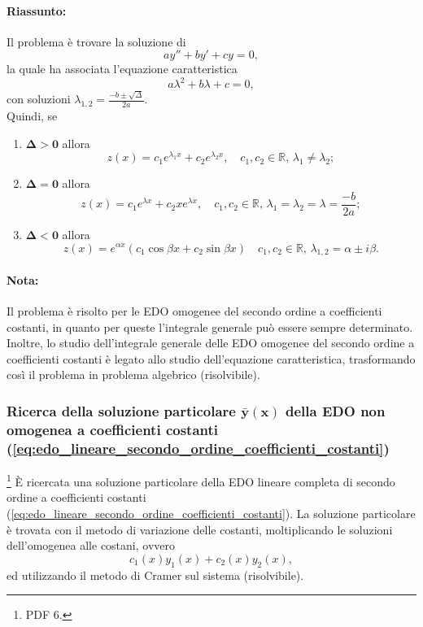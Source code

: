 \paragraph{Riassunto:} Il problema è trovare la soluzione di
\begin{equation*}
	ay'' + b y' + cy = 0,
\end{equation*}
la quale ha associata l'equazione caratteristica
\begin{equation*}
	a\lambda^2 + b\lambda + c = 0,
\end{equation*}
con soluzioni $\lambda_{1,2}=\frac{-b\pm\sqrt{\Delta}}{2a}$.\\
Quindi, se
\begin{enumerate}
	\item $\boldsymbol{\Delta>0}$ allora
	\begin{equation*}
		z(x) = c_1 e^{\lambda_1x} + c_2e^{\lambda_2 x},\quad c_1,c_2\in\mathbb{R},\, \lambda_1 \neq \lambda_2;
	\end{equation*}
	\item $\boldsymbol{\Delta = 0}$ allora
	\begin{equation*}
		z(x) = c_1 e^{\lambda x} + c_2xe^{\lambda x},\quad c_1,c_2\in\mathbb{R},\, \lambda_1 = \lambda_2=\lambda=\frac{-b}{2a};
	\end{equation*}
	\item $\boldsymbol{\Delta<0}$ allora
	\begin{equation*}
		z(x) = e^{\alpha x}(c_1\cos\beta x + c_2 \sin\beta x)\quad c_1,c_2\in\mathbb{R},\, \lambda_{1,2} = \alpha\pm i\beta.
	\end{equation*}
\end{enumerate}

\paragraph{Nota:} Il problema è risolto per le EDO omogenee del secondo ordine a coefficienti costanti, in quanto per queste l'integrale generale può essere sempre determinato. Inoltre, lo studio dell'integrale generale delle EDO omogenee del secondo ordine a coefficienti costanti è legato allo studio dell'equazione caratteristica, trasformando così il problema in problema algebrico (risolvibile).

\subsubsection{Ricerca della soluzione particolare \texorpdfstring{$\boldsymbol{\bar y(x)}$}{y(x)} della EDO non omogenea a coefficienti costanti (\ref{eq:edo_lineare_secondo_ordine_coefficienti_costanti})}
\footnote{PDF 6.}
È ricercata una soluzione particolare della EDO lineare completa di secondo ordine a coefficienti costanti (\ref{eq:edo_lineare_secondo_ordine_coefficienti_costanti}). La soluzione particolare è trovata con il metodo di variazione delle costanti, moltiplicando le soluzioni dell'omogenea alle costani, ovvero
\begin{equation*}
	c_1(x)y_1(x) + c_2(x)y_2(x),
\end{equation*}
ed utilizzando il metodo di Cramer sul sistema (risolvibile).

